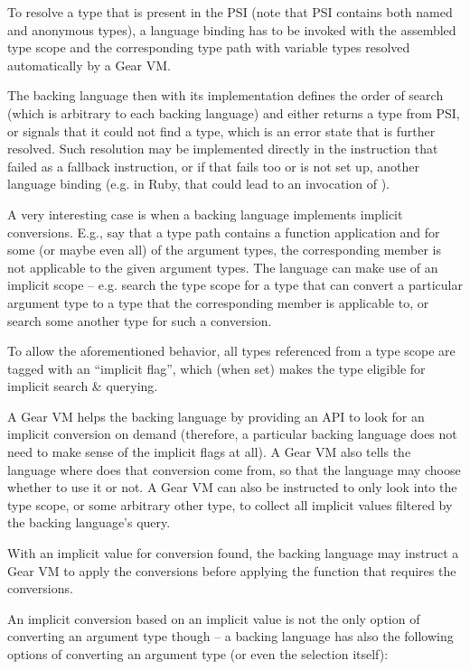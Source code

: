 To resolve a type that is present in the PSI (note that PSI contains both named and anonymous types), a language binding has to be invoked with the assembled type scope and the corresponding type path with variable types resolved automatically by a Gear VM. 

The backing language then with its implementation defines the order of search (which is arbitrary to each backing language) and either returns a type from PSI, or signals that it could not find a type, which is an error state that is further resolved. Such resolution may be implemented directly in the instruction that failed as a fallback instruction, or if that fails too or is not set up, another language binding (e.g. in Ruby, that could lead to an invocation of ). 

A very interesting case is when a backing language implements implicit conversions. E.g., say that a type path contains a function application and for some (or maybe even all) of the argument types, the corresponding member is not applicable to the given argument types. The language can make use of an implicit scope -- e.g. search the type scope for a type that can convert a particular argument type to a type that the corresponding member is applicable to, or search some another type for such a conversion. 

To allow the aforementioned behavior, all types referenced from a type scope are tagged with an ``implicit flag'', which (when set) makes the type eligible for implicit search \& querying. 

A Gear VM helps the backing language by providing an API to look for an implicit conversion on demand (therefore, a particular backing language does not need to make sense of the implicit flags at all). A Gear VM also tells the language where does that conversion come from, so that the language may choose whether to use it or not. A Gear VM can also be instructed to only look into the type scope, or some arbitrary other type, to collect all implicit values filtered by the backing language's query. 

With an implicit value for conversion found, the backing language may instruct a Gear VM to apply the conversions before applying the function that requires the conversions. 

An implicit conversion based on an implicit value is not the only option of converting an argument type though -- a backing language has also the following options of converting an argument type (or even the selection itself): 

